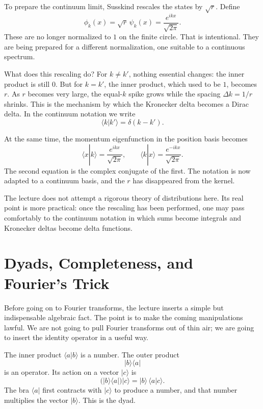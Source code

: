 To prepare the continuum limit, Susskind rescales the states by \(\sqrt r\). Define
\begin{equation}
\phi_k(x)=\sqrt r\,\psi_k(x)=\frac{e^{ikx}}{\sqrt{2\pi}}.
\end{equation}
These are no longer normalized to \(1\) on the finite circle. That is intentional. They are being prepared for a different normalization, one suitable to a continuous spectrum.

What does this rescaling do? For \(k\neq k'\), nothing essential changes: the inner product is still \(0\). But for \(k=k'\), the inner product, which used to be \(1\), becomes \(r\). As \(r\) becomes very large, the equal-\(k\) spike grows while the spacing \(\Delta k=1/r\) shrinks. This is the mechanism by which the Kronecker delta becomes a Dirac delta. In the continuum notation we write
\begin{equation}
\langle k|k'\rangle=\delta(k-k').
\end{equation}

At the same time, the momentum eigenfunction in the position basis becomes
\begin{equation}
\langle x|k\rangle=\frac{e^{ikx}}{\sqrt{2\pi}},
\qquad
\langle k|x\rangle=\frac{e^{-ikx}}{\sqrt{2\pi}}.
\end{equation}
The second equation is the complex conjugate of the first. The notation is now adapted to a continuum basis, and the \(r\) has disappeared from the kernel.

The lecture does not attempt a rigorous theory of distributions here. Its real point is more practical: once the rescaling has been performed, one may pass comfortably to the continuum notation in which sums become integrals and Kronecker deltas become delta functions.

\section{Dyads, Completeness, and Fourier's Trick}

Before going on to Fourier transforms, the lecture inserts a simple but indispensable algebraic fact. The point is to make the coming manipulations lawful. We are not going to pull Fourier transforms out of thin air; we are going to insert the identity operator in a useful way.

The inner product \(\langle a|b\rangle\) is a number. The outer product
\begin{equation}
|b\rangle\langle a|
\end{equation}
is an operator. Its action on a vector \(|c\rangle\) is
\begin{equation}
\bigl(|b\rangle\langle a|\bigr)|c\rangle
=
|b\rangle\,\langle a|c\rangle.
\end{equation}
The bra \(\langle a|\) first contracts with \(|c\rangle\) to produce a number, and that number multiplies the vector \(|b\rangle\). This is the dyad.

